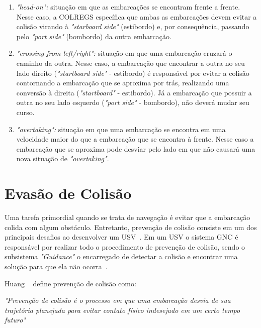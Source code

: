        \begin{enumerate}
            \item \textit{"head-on":} situação em que as embarcações se encontram frente a frente. Nesse caso, a COLREGS específica que ambas as embarcações devem evitar a colisão virando à \textit{"starboard side"} (estibordo) e, por consequência, passando pelo \textit{"port side"} (bombordo) da outra embarcação.
            
            \item \textit{"crossing from left/right":} situação em que uma embarcação cruzará o caminho da outra. Nesse caso, a embarcação que encontrar a outra no seu lado direito (\textit{"startboard side"} - estibordo) é responsável por evitar a colisão contornando a embarcação que se aproxima por trás, realizando uma conversão à direita (\textit{"startboard"} - estibordo). Já a embarcação que possuir a outra no seu lado esquerdo (\textit{"port side"} - bombordo), não deverá mudar seu curso.
            
            \item \textit{"overtaking":} situação em que uma embarcação se encontra em uma velocidade maior do que a embarcação que se encontra à frente. Nesse caso a embarcação que se aproxima pode desviar pelo lado em que não causará uma nova situação de \textit{"overtaking"}.
        \end{enumerate}
    
    \section{Evasão de Colisão}\label{subchap2:prev_col}
        Uma tarefa primordial quando se trata de navegação é evitar que a embarcação colida com algum obstáculo. Entretanto, prevenção de colisão consiste em um dos principais desafios ao desenvolver um USV~\cite{JURAK2020}. Em um USV o sistema GNC é responsável por realizar todo o procedimento de prevenção de colisão, sendo o subsistema \textit{"Guidance"} o encarregado de detectar a colisão e encontrar uma solução para que ela não ocorra~\cite{HUANG2020451}.
        
        Huang \etal~\cite[p.451]{HUANG2020451} define prevenção de colisão como:
        \begin{directcite}
            \textit{"Prevenção de colisão é o processo em que uma embarcação desvia de sua trajetória planejada para evitar contato físico indesejado em um certo tempo futuro"}
        \end{directcite}
        
